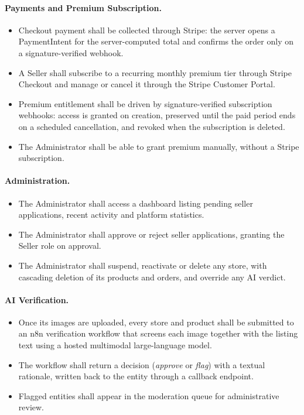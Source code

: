 \paragraph{Payments and Premium Subscription.}
\begin{itemize}[leftmargin=*,itemsep=1pt]
  \item Checkout payment shall be collected through Stripe: the server
        opens a PaymentIntent for the server-computed total and confirms
        the order only on a signature-verified webhook.
  \item A Seller shall subscribe to a recurring monthly premium tier
        through Stripe Checkout and manage or cancel it through the Stripe
        Customer Portal.
  \item Premium entitlement shall be driven by signature-verified
        subscription webhooks: access is granted on creation, preserved
        until the paid period ends on a scheduled cancellation, and revoked
        when the subscription is deleted.
  \item The Administrator shall be able to grant premium manually, without
        a Stripe subscription.
\end{itemize}

\paragraph{Administration.}
\begin{itemize}[leftmargin=*,itemsep=1pt]
  \item The Administrator shall access a dashboard listing pending
        seller applications, recent activity and platform statistics.
  \item The Administrator shall approve or reject seller applications,
        granting the Seller role on approval.
  \item The Administrator shall suspend, reactivate or delete any store,
        with cascading deletion of its products and orders, and override
        any AI verdict.
\end{itemize}

\paragraph{AI Verification.}
\begin{itemize}[leftmargin=*,itemsep=1pt]
  \item Once its images are uploaded, every store and product shall be
        submitted to an n8n verification workflow that screens each
        image together with the listing text using a hosted multimodal
        large-language model.
  \item The workflow shall return a decision (\textit{approve} or
        \textit{flag}) with a textual rationale, written back to the
        entity through a callback endpoint.
  \item Flagged entities shall appear in the moderation queue for
        administrative review.
\end{itemize}


